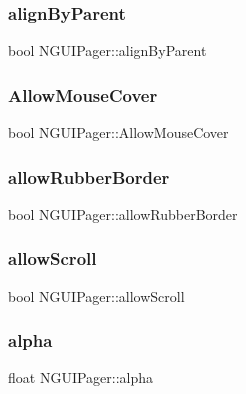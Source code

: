 \subsubsection{\texorpdfstring{align\+By\+Parent}{alignByParent}}
{\footnotesize\ttfamily bool N\+G\+U\+I\+Pager\+::align\+By\+Parent}

\hypertarget{class_n_g_u_i_pager_addb975e75fa28cbe7f457aa4976fbf84}{}\label{class_n_g_u_i_pager_addb975e75fa28cbe7f457aa4976fbf84} 
\subsubsection{\texorpdfstring{Allow\+Mouse\+Cover}{AllowMouseCover}}
{\footnotesize\ttfamily bool N\+G\+U\+I\+Pager\+::\+Allow\+Mouse\+Cover}

\hypertarget{class_n_g_u_i_pager_a14d4f7a260013eb8d90674b8b755bd92}{}\label{class_n_g_u_i_pager_a14d4f7a260013eb8d90674b8b755bd92} 
\subsubsection{\texorpdfstring{allow\+Rubber\+Border}{allowRubberBorder}}
{\footnotesize\ttfamily bool N\+G\+U\+I\+Pager\+::allow\+Rubber\+Border}

\hypertarget{class_n_g_u_i_pager_a26be79629d5838d4060fa361bcfa3665}{}\label{class_n_g_u_i_pager_a26be79629d5838d4060fa361bcfa3665} 
\subsubsection{\texorpdfstring{allow\+Scroll}{allowScroll}}
{\footnotesize\ttfamily bool N\+G\+U\+I\+Pager\+::allow\+Scroll}

\hypertarget{class_n_g_u_i_pager_a81da23e9dd2d1fd4e0cea722b0b8a5b6}{}\label{class_n_g_u_i_pager_a81da23e9dd2d1fd4e0cea722b0b8a5b6} 
\subsubsection{\texorpdfstring{alpha}{alpha}}
{\footnotesize\ttfamily float N\+G\+U\+I\+Pager\+::alpha}


